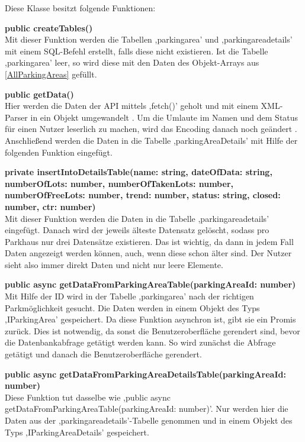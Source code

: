 Diese Klasse besitzt folgende Funktionen:
\begin{description}
	\item \textbf{public createTables()} \\ Mit dieser Funktion werden die Tabellen ,parkingarea' und ,parkingareadetails' mit einem SQL-Befehl erstellt, falls diese nicht existieren. Ist die Tabelle ,parkingarea' leer, so wird diese mit den Daten des Objekt-Arrays aus \autoref{AllParkingAreas} gefüllt.
	\item \textbf{public getData()} \\ Hier werden die Daten der API mittels ,fetch()' geholt und mit einem XML-Parser in ein Objekt umgewandelt \cite{xmlParser}. Um die Umlaute im Namen und dem Status für einen Nutzer leserlich zu machen, wird das Encoding danach noch geändert \cite{htmlEntities}. Anschließend werden die Daten in die Tabelle ,parkingAreaDetails' mit Hilfe der folgenden Funktion eingefügt.
	\item \textbf{private insertIntoDetailsTable(name: string, dateOfData: string, numberOfLots: number, numberOfTakenLots: number, numberOfFreeLots: number, trend: number, status: string, closed: number, ctr: number)} \\ Mit dieser Funktion werden die Daten in die Tabelle ,parkingareadetails' eingefügt. Danach wird der jeweils älteste Datensatz gelöscht, sodass pro Parkhaus nur drei Datensätze existieren. Das ist wichtig, da dann in jedem Fall Daten angezeigt werden können, auch, wenn diese schon älter sind. Der Nutzer sieht also immer direkt Daten und nicht nur leere Elemente.
	\item \textbf{public async getDataFromParkingAreaTable(parkingAreaId: number)} \\ Mit Hilfe der ID wird in der Tabelle ,parkingarea' nach der richtigen Parkmöglichkeit gesucht. Die Daten werden in einem Objekt des Typs ,IParkingArea' gespeichert. Da diese Funktion asynchron ist, gibt sie ein Promis zurück. Dies ist notwendig, da sonst die Benutzeroberfläche gerendert sind, bevor die Datenbankabfrage getätigt werden kann. So wird zunächst die Abfrage getätigt und danach die Benutzeroberfläche gerendert.
	\item \textbf{public async getDataFromParkingAreaDetailsTable(parkingAreaId: number)} \\ Diese Funktion tut dasselbe wie ,public async getDataFromParkingAreaTable(parkingAreaId: number)'. Nur werden hier die Daten aus der ,parkingareadetails'-Tabelle genommen und in einem Objekt des Typs ,IParkingAreaDetails' gespeichert.

\end{description}
